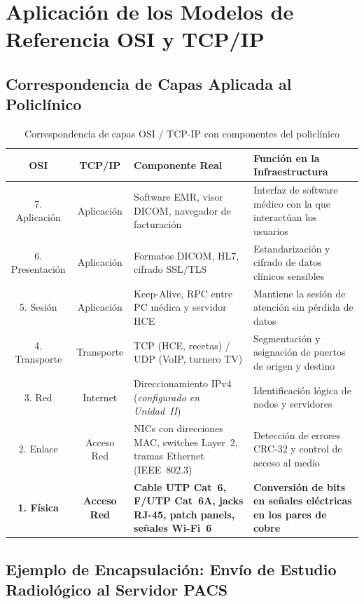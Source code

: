 \section{Aplicación de los Modelos de Referencia OSI y TCP/IP}

\subsection{Correspondencia de Capas Aplicada al Policlínico}

\begin{table}[H]
\centering
\caption{Correspondencia de capas OSI / TCP-IP con componentes del policlínico}
\begin{tabularx}{\textwidth}{@{}ccXX@{}}
\toprule
\textbf{OSI} & \textbf{TCP/IP} & \textbf{Componente Real} & \textbf{Función en la Infraestructura} \\
\midrule
7. Aplicación & Aplicación & Software EMR, visor DICOM, navegador de facturación & Interfaz de software médico con la que interactúan los usuarios \\
6. Presentación & Aplicación & Formatos DICOM, HL7, cifrado SSL/TLS & Estandarización y cifrado de datos clínicos sensibles \\
5. Sesión & Aplicación & Keep-Alive, RPC entre PC médica y servidor HCE & Mantiene la sesión de atención sin pérdida de datos \\
4. Transporte & Transporte & TCP (HCE, recetas) / UDP (VoIP, turnero TV) & Segmentación y asignación de puertos de origen y destino \\
3. Red & Internet & Direccionamiento IPv4 (\textit{configurado en Unidad~II}) & Identificación lógica de nodos y servidores \\
2. Enlace & Acceso Red & NICs con direcciones MAC, switches Layer~2, tramas Ethernet (IEEE~802.3) & Detección de errores CRC-32 y control de acceso al medio \\
\textbf{1. Física} & \textbf{Acceso Red} & \textbf{Cable UTP Cat~6, F/UTP Cat~6A, jacks RJ-45, patch panels, señales Wi-Fi~6} & \textbf{Conversión de bits en señales eléctricas en los pares de cobre} \\
\bottomrule
\end{tabularx}
\label{tab:capas-osi}
\end{table}

\subsection{Ejemplo de Encapsulación: Envío de Estudio Radiológico al Servidor PACS}

